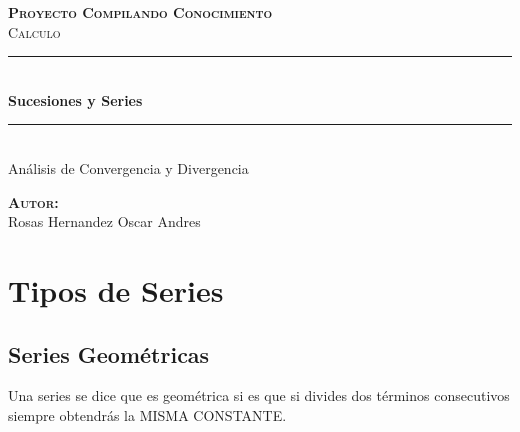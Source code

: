 \documentclass[12pt]{report}                                %
\author{Oscar Andrés Rosas}                                 %
\begin{document}
\begin{titlepage}

    \center
    \textbf{\textsc{\Large Proyecto Compilando Conocimiento}}\\[1.0cm] 
    \textsc{\Large Calculo}\\[1.0cm] 

    \rule{\linewidth}{0.5mm} \\[1.0cm]
        { \huge \bfseries Sucesiones y Series}\\[1.0cm] 
    \rule{\linewidth}{0.5mm} \\[2.0cm]
    
    {\LARGE Análisis de Convergencia y Divergencia}\\[7cm] 
    
    \begin{center} \large
    \textbf{\textsc{Autor:}}\\
    Rosas Hernandez Oscar Andres
    \end{center}

    \vfill

\end{titlepage}

\tableofcontents{}
\clearpage

\chapter{Tipos de Series}
    \clearpage

    \section{Series Geométricas}

        Una series se dice que es geométrica si es que si divides dos términos
        consecutivos siempre obtendrás la MISMA CONSTANTE.
\end{document}

